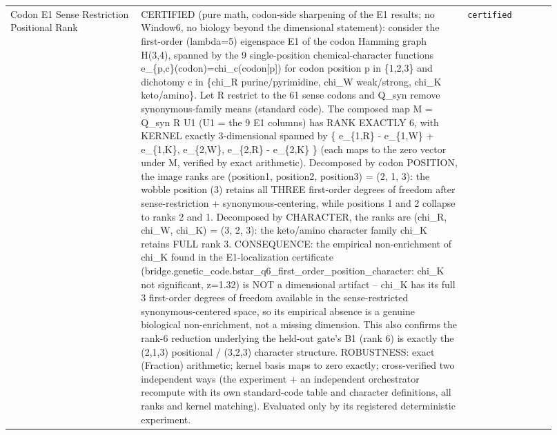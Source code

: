 \begin{longtable}{>{\raggedright\arraybackslash}p{0.22\linewidth}>{\raggedright\arraybackslash}p{0.55\linewidth}>{\raggedright\arraybackslash}p{0.15\linewidth}}
Codon E1 Sense Restriction Positional Rank & CERTIFIED (pure math, codon-side sharpening of the E1 results; no Window6, no biology beyond the dimensional statement): consider the first-order (lambda=5) eigenspace E1 of the codon Hamming graph H(3,4), spanned by the 9 single-position chemical-character functions e\_\{p,c\}(codon)=chi\_c(codon[p]) for codon position p in \{1,2,3\} and dichotomy c in \{chi\_R purine/pyrimidine, chi\_W weak/strong, chi\_K keto/amino\}. Let R restrict to the 61 sense codons and Q\_syn remove synonymous-family means (standard code). The composed map M = Q\_syn R U1 (U1 = the 9 E1 columns) has RANK EXACTLY 6, with KERNEL exactly 3-dimensional spanned by \{ e\_\{1,R\} - e\_\{1,W\} + e\_\{1,K\}, e\_\{2,W\}, e\_\{2,R\} - e\_\{2,K\} \} (each maps to the zero vector under M, verified by exact arithmetic). Decomposed by codon POSITION, the image ranks are (position1, position2, position3) = (2, 1, 3): the wobble position (3) retains all THREE first-order degrees of freedom after sense-restriction + synonymous-centering, while positions 1 and 2 collapse to ranks 2 and 1. Decomposed by CHARACTER, the ranks are (chi\_R, chi\_W, chi\_K) = (3, 2, 3): the keto/amino character family chi\_K retains FULL rank 3. CONSEQUENCE: the empirical non-enrichment of chi\_K found in the E1-localization certificate (bridge.genetic\_code.bstar\_q6\_first\_order\_position\_character: chi\_K not significant, z=1.32) is NOT a dimensional artifact -- chi\_K has its full 3 first-order degrees of freedom available in the sense-restricted synonymous-centered space, so its empirical absence is a genuine biological non-enrichment, not a missing dimension. This also confirms the rank-6 reduction underlying the held-out gate's B1 (rank 6) is exactly the (2,1,3) positional / (3,2,3) character structure. ROBUSTNESS: exact (Fraction) arithmetic; kernel basis maps to zero exactly; cross-verified two independent ways (the experiment + an independent orchestrator recompute with its own standard-code table and character definitions, all ranks and kernel matching). Evaluated only by its registered deterministic experiment. & \texttt{certified} \\

\end{longtable}
